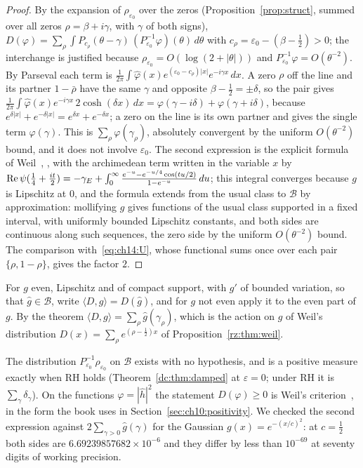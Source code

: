\begin{proof}
By the expansion of $\rho_{\varepsilon_0}$ over the zeros (Proposition~\ref{prop:struct}, summed over all zeros $\rho=\beta+i\gamma$, with $\gamma$ of both signs), $D(\varphi)=\sum_\rho\int P_{c_\rho}(\theta-\gamma)\,(P_{\varepsilon_0}^{-1}\varphi)(\theta)\,d\theta$ with $c_\rho=\varepsilon_0-(\beta-\frac12)>0$; the interchange is justified because $\rho_{\varepsilon_0}=O(\log(2+|\theta|))$ and $P_{\varepsilon_0}^{-1}\varphi=O(\theta^{-2})$. By Parseval each term is $\frac1{2\pi}\int\hat\varphi(x)e^{(\varepsilon_0-c_\rho)|x|}e^{-i\gamma x}\,dx$. A zero $\rho$ off the line and its partner $1-\bar\rho$ have the same $\gamma$ and opposite $\beta-\frac12=\pm\delta$, so the pair gives $\frac1{2\pi}\int\hat\varphi(x)e^{-i\gamma x}\,2\cosh(\delta x)\,dx=\varphi(\gamma-i\delta)+\varphi(\gamma+i\delta)$, because $e^{\delta|x|}+e^{-\delta|x|}=e^{\delta x}+e^{-\delta x}$; a zero on the line is its own partner and gives the single term $\varphi(\gamma)$. This is $\sum_\rho\varphi(\gamma_\rho)$, absolutely convergent by the uniform $O(\theta^{-2})$ bound, and it does not involve $\varepsilon_0$. The second expression is the explicit formula of Weil~\cite{Weil52}, \cite[Theorem 5.12]{IwaniecKowalski04}, with the archimedean term written in the variable $x$ by $\operatorname{Re}\psi(\frac14+\frac{it}2)=-\gamma_E+\int_0^\infty\frac{e^{-u}-e^{-u/4}\cos(tu/2)}{1-e^{-u}}\,du$; this integral converges because $g$ is Lipschitz at $0$, and the formula extends from the usual class to $\mathcal B$ by approximation: mollifying $g$ gives functions of the usual class supported in a fixed interval, with uniformly bounded Lipschitz constants, and both sides are continuous along such sequences, the zero side by the uniform $O(\theta^{-2})$ bound. The comparison with~\eqref{eq:ch14:U}, whose functional sums once over each pair $\{\rho,1-\rho\}$, gives the factor $2$.
\end{proof}

For $g$ even, Lipschitz and of compact support, with $g'$ of bounded variation, so that $\hat g\in\mathcal B$, write $\langle D,g\rangle=D(\hat g)$, and for $g$ not even apply it to the even part of $g$. By the theorem $\langle D,g\rangle=\sum_\rho\hat g(\gamma_\rho)$, which is the action on $g$ of Weil's distribution $D(x)=\sum_\rho e^{(\rho-\frac12)x}$ of Proposition~\ref{rz:thm:weil}.

The distribution $P_{\varepsilon_0}^{-1}\rho_{\varepsilon_0}$ on $\mathcal B$ exists with no hypothesis, and is a positive measure exactly when RH holds (Theorem~\ref{dc:thm:damped} at $\varepsilon=0$; under RH it is $\sum_\gamma\delta_\gamma$). On the functions $\varphi=|\hat h|^2$ the statement $D(\varphi)\ge0$ is Weil's criterion~\cite{Weil52}, in the form the book uses in Section~\ref{sec:ch10:positivity}. We checked the second expression against $2\sum_{\gamma>0}\hat g(\gamma)$ for the Gaussian $g(x)=e^{-(x/c)^2}$: at $c=\frac12$ both sides are $6.69239857682\times10^{-6}$ and they differ by less than $10^{-69}$ at seventy digits of working precision.

